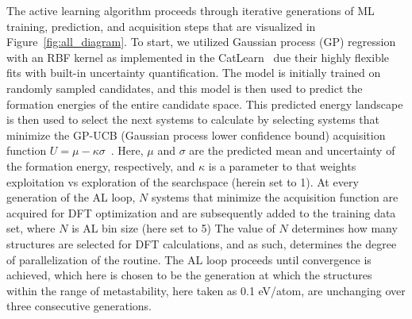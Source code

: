 %
%
The active learning algorithm proceeds through iterative generations of ML training, prediction, and acquisition steps that are visualized in Figure~\ref{fig:all_diagram}.
%
To start, we utilized Gaussian process (GP) regression with an RBF kernel as implemented in the CatLearn~\cite{hansen2019atomistic,CatLearn_Repo} due their highly flexible fits with built-in uncertainty quantification.
%
%
The model is initially trained on randomly sampled candidates, and this model is then used to predict the formation energies of the entire candidate space.
%
This predicted energy landscape is then used to select the next systems to calculate by selecting systems that minimize the GP-UCB (Gaussian process lower confidence bound) acquisition function $U = \mu - \kappa \sigma$~\cite{Cox1992}.
%
Here, $\mu$ and $\sigma$ are the predicted mean and uncertainty of the formation energy, respectively,
and $\kappa$ is a parameter to that weights exploitation vs exploration of the searchspace (herein set to 1).
%
At every generation of the AL loop, $N$ systems that minimize the acquisition function are acquired for DFT optimization and are subsequently added to the training data set, where $N$ is AL bin size (here set to 5)
%
The value of $N$ determines how many structures are selected for DFT calculations,
and as such, determines the degree of parallelization of the routine.
%
%
%
The AL loop proceeds until convergence is achieved, which here is chosen to be the generation at which the structures within the range of metastability, here taken as \num{0.1} eV/atom, are unchanging over three consecutive generations.


